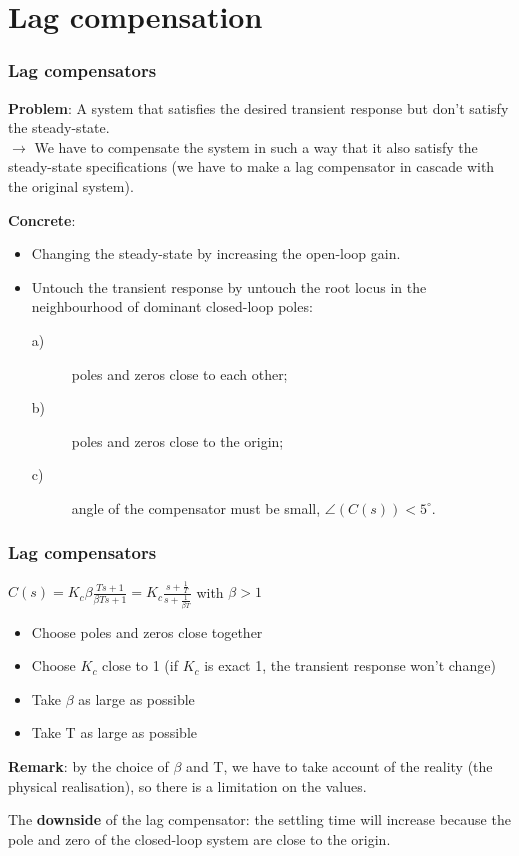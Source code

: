 \section{Lag compensation}

\begin{frame}
	\frametitle{Lag compensators}
		 \textbf{Problem}: A system that satisfies the desired transient response but don't satisfy the steady-state. \\
		 $\rightarrow$ We have to compensate the system in such a way that it also satisfy the steady-state specifications (we have to make a lag compensator in cascade with the original system).
		 \vspace{4mm}
		  
		 \textbf{Concrete}:
		 \begin{itemize}
		 	\item Changing the steady-state by increasing the open-loop gain.
		 	\item Untouch the transient response by untouch the root locus in the neighbourhood of dominant closed-loop poles:
		 	\begin{description}
		 		\item [a)] poles and zeros close to each other;
		 		\item [b)] poles and zeros close to the origin;
		 		\item [c)] angle of the compensator must be small, $\angle(C(s))<5^{\circ}$.
		 	\end{description}
		 \end{itemize}
\end{frame}

\begin{frame}
	\frametitle{Lag compensators}
		$C(s)=K_c \beta\frac{Ts+1}{\beta Ts+1}= K_c\frac{s+\frac{1}{T}}{s+\frac{1}{\beta T}}$ with $\beta>1$\\
		\begin{itemize}
			\item Choose poles and zeros close together
			\item Choose $K_c$ close to 1 (if $K_c$ is exact 1, the transient response won't change)
			\item Take $\beta$ as large as possible
			\item Take T as large as possible 
		\end{itemize}
		\vspace{3mm}
		
		\textbf{Remark}: by the choice of $\beta$ and T, we have to take account of the reality (the physical realisation), so there is a limitation on the values.  \vspace{3mm}
		
		The \textbf{downside} of the lag compensator: the settling time will increase because the pole and zero of the closed-loop system are close to the origin. 
\end{frame}

